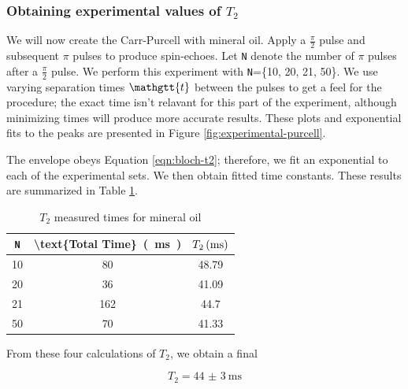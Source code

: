 \documentclass[%
 reprint,
 amsmath,amssymb,
 aps,
]{revtex4-2}
\newcommand{\halfpi}{\frac{\pi}{2}}
\newcommand{\taucode}{\mathgtt{t}}
\begin{document}
\subsubsection{Obtaining experimental values of $T_2$}

We will now create the Carr-Purcell with mineral oil. Apply a $\halfpi$ pulse and subsequent $\pi$ pulses to produce spin-echoes. Let \texttt{N} denote the number of $\pi$ pulses after a $\halfpi$ pulse. We perform this experiment with \texttt{N}=\{10, 20, 21, 50\}. We use varying separation times $\taucode$ between the pulses to get a feel for the procedure; the exact time isn't relavant for this part of the experiment, although minimizing times will produce more accurate results. These plots and exponential fits to the peaks are presented in Figure \ref{fig:experimental-purcell}. 

The envelope obeys Equation \ref{eqn:bloch-t2}; therefore, we fit an exponential to each of the experimental sets. We then obtain fitted time constants. These results are summarized in Table \ref{tab:t2-times}.

\begin{table}[htbp]
    \centering
    \caption{$T_2$ measured times for mineral oil}
      \begin{tabular}{|c|c|c|}
      \hline
      \texttt{N} & \SI[parse-numbers=false]{\text{Total Time}}{(\milli\second)} & $\SI[parse-numbers=false]{T_2}{(\milli\second)}$\\
      
      \hline
      10    & 80    & 48.79 \\
      \hline
      20    & 36    & 41.09 \\
      \hline
      21    & 162   & 44.7 \\
      \hline
      50    & 70    & 41.33 \\
      \hline
      \end{tabular}%
    \label{tab:t2-times}%
  \end{table}%
  
From these four calculations of $T_2$, we obtain a final\cite{lab-manual}

\begin{equation}
    T_2 = \SI[uncertainty-mode=separate]{44(3)}{\milli\second}
\end{equation}
\end{document}
